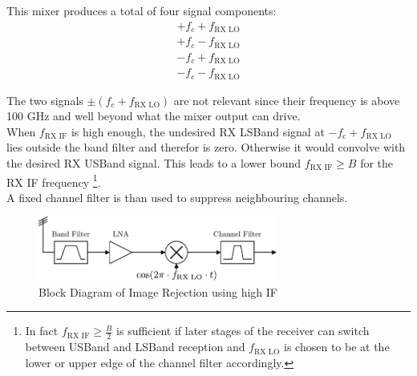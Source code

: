 This mixer produces a total of four signal components:
\begin{align}
  + f_{c} + f_{\text{RX LO}} \\
  + f_{c} - f_{\text{RX LO}} \\
  - f_{c} + f_{\text{RX LO}} \\
  - f_{c} - f_{\text{RX LO}}
\end{align}

The two signals $\pm (f_{c} + f_{\text{RX LO}})$ are not relevant since their
frequency is above 100 GHz and well beyond what the mixer output can drive. \\

When $f_{\text{RX IF}}$ is high enough, the undesired \gls{RX} \gls{LSBand}
signal at $-f_{\text{c}} + f_{\text{RX LO}}$ lies outside the band filter
and therefor is zero. Otherwise it would convolve with the desired
\gls{RX} \gls{USBand} signal. This leads to a lower bound
$f_{\text{RX IF}} \geq B$ for the \gls{RX} \gls{IF} frequency
\footnote{%
  In fact $f_{\text{RX IF}} \geq \frac{B}{2}$
  is sufficient if later stages of the receiver can switch
  between \gls{USBand} and \gls{LSBand} reception and
  $f_{\text{RX LO}}$ is chosen to be at the lower or upper edge of the
  channel filter accordingly.}. \\

A fixed channel filter is than used to suppress neighbouring channels. \\

\begin{figure}[h!]
  \centering
  \includegraphics[width=0.7\textwidth]{figures/rx_rf_0_bd}
  \caption{Block Diagram of Image Rejection using high \gls{IF}}
  \label{fig:rx_rf_0_bd}
\end{figure}

